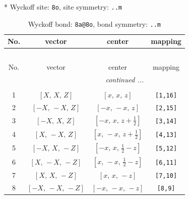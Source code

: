 \documentclass[fleqn,8pt]{jsarticle}
\begin{document}
* Wyckoff site: {\tt 8o}, site symmetry: {\tt ..m}
\renewcommand{\arraystretch}{1.2}
\begin{longtable}{cccc}
\caption{Wyckoff bond: {\tt 8a@8o}, bond symmetry: {\tt ..m}}
 \\
 \hline \hline
No. & vector & center & mapping \\ \hline \endfirsthead

\multicolumn{3}{l}{\tablename\ \thetable{}} \\
 \hline \hline
No. & vector & center & mapping \\ \hline \endhead

 \hline \hline
\multicolumn{3}{r}{\footnotesize\it continued ...} \\ \endfoot

 \hline \hline
\multicolumn{3}{r}{} \\ \endlastfoot

1 & $\left[ X,\, X,\, Z \right]$ & $\left[ x,\, x,\, z \right]$ & {\tt [1,16]} \\ \hline
2 & $\left[ - X,\, - X,\, Z \right]$ & $\left[ - x,\, - x,\, z \right]$ & {\tt [2,15]} \\ \hline
3 & $\left[ - X,\, X,\, Z \right]$ & $\left[ - x,\, x,\, z + \frac{1}{2} \right]$ & {\tt [3,14]} \\ \hline
4 & $\left[ X,\, - X,\, Z \right]$ & $\left[ x,\, - x,\, z + \frac{1}{2} \right]$ & {\tt [4,13]} \\ \hline
5 & $\left[ - X,\, X,\, - Z \right]$ & $\left[ - x,\, x,\, \frac{1}{2} - z \right]$ & {\tt [5,12]} \\ \hline
6 & $\left[ X,\, - X,\, - Z \right]$ & $\left[ x,\, - x,\, \frac{1}{2} - z \right]$ & {\tt [6,11]} \\ \hline
7 & $\left[ X,\, X,\, - Z \right]$ & $\left[ x,\, x,\, - z \right]$ & {\tt [7,10]} \\ \hline
8 & $\left[ - X,\, - X,\, - Z \right]$ & $\left[ - x,\, - x,\, - z \right]$ & {\tt [8,9]} \\
\end{longtable}
\renewcommand{\arraystretch}{1.2}
\end{document}
